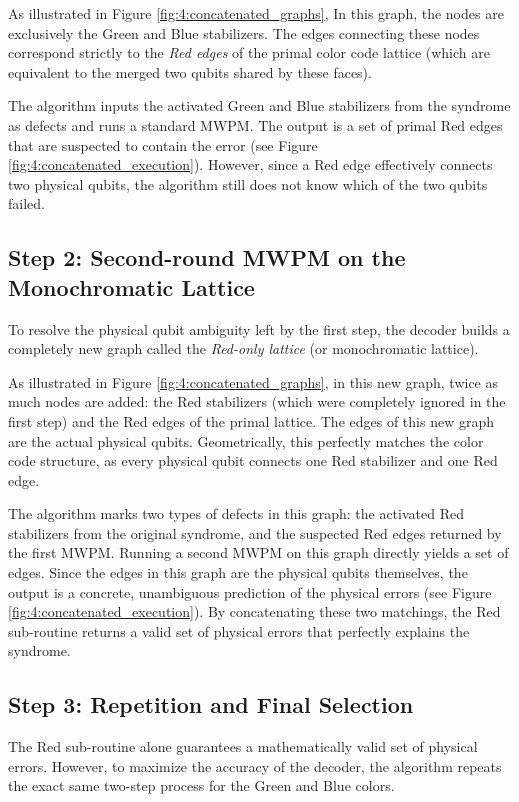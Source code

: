 As illustrated in Figure \ref{fig:4:concatenated_graphs}, In this graph, the nodes are exclusively the Green and Blue stabilizers. The edges connecting these nodes correspond strictly to the \textit{Red edges} of the primal color code lattice (which are equivalent to the merged two qubits shared by these faces). 

The algorithm inputs the activated Green and Blue stabilizers from the syndrome as defects and runs a standard MWPM. The output is a set of primal Red edges that are suspected to contain the error (see Figure \ref{fig:4:concatenated_execution}). However, since a Red edge effectively connects two physical qubits, the algorithm still does not know which of the two qubits failed.

\subsection{Step 2: Second-round MWPM on the Monochromatic Lattice}
To resolve the physical qubit ambiguity left by the first step, the decoder builds a completely new graph called the \textit{Red-only lattice} (or monochromatic lattice).

As illustrated in Figure \ref{fig:4:concatenated_graphs}, in this new graph, twice as much nodes are added: the Red stabilizers (which were completely ignored in the first step) and the Red edges of the primal lattice. The edges of this new graph are the actual physical qubits. Geometrically, this perfectly matches the color code structure, as every physical qubit connects one Red stabilizer and one Red edge.
    
The algorithm marks two types of defects in this graph: the activated Red stabilizers from the original syndrome, and the suspected Red edges returned by the first MWPM. Running a second MWPM on this graph directly yields a set of edges. Since the edges in this graph are the physical qubits themselves, the output is a concrete, unambiguous prediction of the physical errors (see Figure \ref{fig:4:concatenated_execution}). By concatenating these two matchings, the Red sub-routine returns a valid set of physical errors that perfectly explains the syndrome.

\subsection{Step 3: Repetition and Final Selection}
The Red sub-routine alone guarantees a mathematically valid set of physical errors. However, to maximize the accuracy of the decoder, the algorithm repeats the exact same two-step process for the Green and Blue colors.

